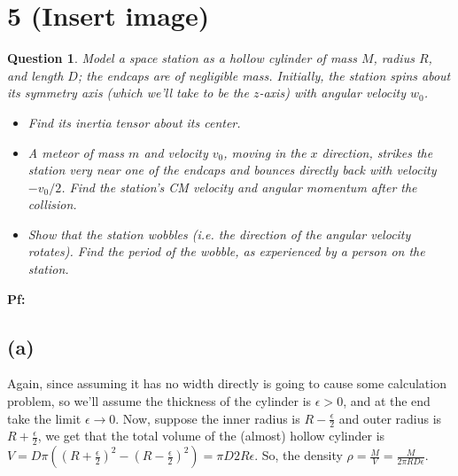 \documentclass{article}
\newtheorem{question}{Question}
\begin{document}
\break

\section*{5 (Insert image)}
\begin{question}\label{q5}
    Model a space station as a hollow cylinder of mass $M$, radius $R$, and length $D$; the endcaps are of negligible mass. Initially, the station spins about its symmetry axis (which we'll take to be the $z$-axis) with angular velocity $w_0$.
    \begin{itemize}
        \item[(a)] Find its inertia tensor about its center.
        \item[(b)] A meteor of mass $m$ and velocity $v_0$, moving in the $x$ direction, strikes the station very near one of the endcaps and bounces directly back with velocity $-v_0/2$. Find the station's CM velocity and angular momentum after the collision.
        \item[(c)] Show that the station wobbles (i.e. the direction of the angular velocity rotates). Find the period of the wobble, as experienced by a person on the station.  
    \end{itemize}
\end{question}

\textbf{Pf:}
\subsection*{(a)}
Again, since assuming it has no width directly is going to cause some calculation problem, so we'll assume the thickness of the cylinder is $\epsilon>0$, and at the end take the limit $\epsilon\rightarrow 0$. Now, suppose the inner radius is $R-\frac{\epsilon}{2}$ and outer radius is $R+\frac{\epsilon}{2}$, we get that the total volume of the (almost) hollow cylinder is $V=D\pi((R+\frac{\epsilon}{2})^2-(R-\frac{\epsilon}{2})^2) = \pi D2R\epsilon$. So, the density $\rho = \frac{M}{V}=\frac{M}{2\pi RD\epsilon}$.
\end{document}
